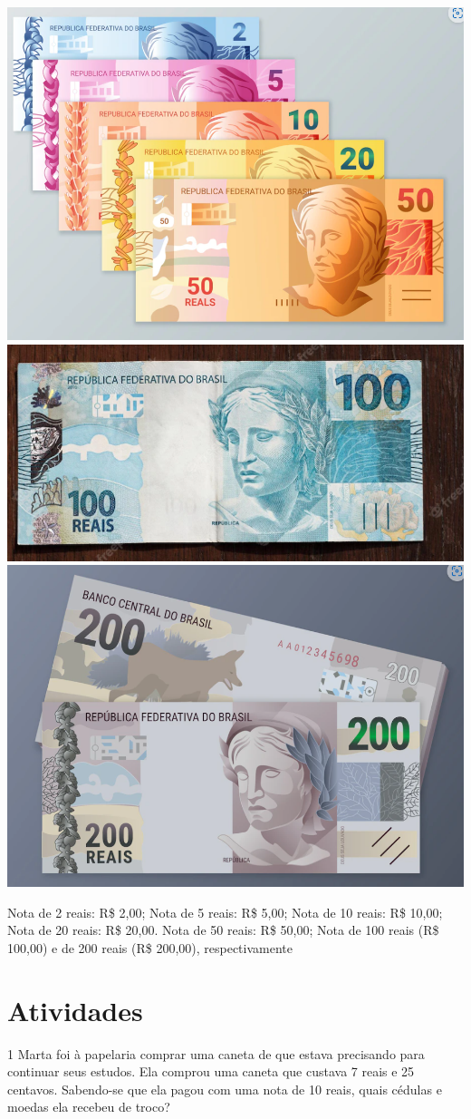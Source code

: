 {\bigskip


\includegraphics[width=.3\textwidth]{./imgs/mat10f.png}
\includegraphics[width=.3\textwidth]{./imgs/mat10g.png}
\includegraphics[width=.3\textwidth]{./imgs/mat10h.png}

Nota de 2 reais: R\$ 2,00; Nota de 5 reais: R\$ 5,00; Nota de 10 reais: R\$ 10,00; Nota de 20 reais: R\$ 20,00. Nota de 50 reais: R\$ 50,00; Nota de 100 reais (R\$ 100,00) e de 200 reais (R\$ 200,00), respectivamente
}

\pagebreak

\section*{Atividades}

\num{1} Marta foi à papelaria comprar uma caneta de que estava precisando para continuar seus estudos. Ela comprou uma caneta que custava 7 reais e 25
centavos. Sabendo-se que ela pagou com uma nota de 10 reais, quais
cédulas e moedas ela recebeu de troco?

\begin{emptybox}
\end{emptybox}


